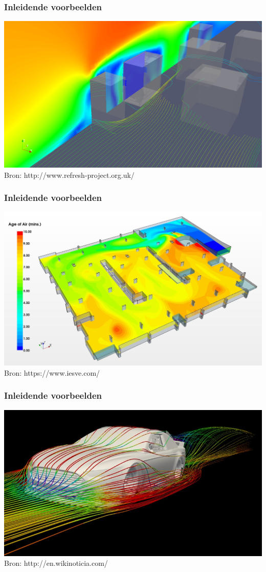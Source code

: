 \documentclass[t]{beamer}
\subtitle{Inleiding}
\begin{document}
	\frame{\titlepage}
	\begin{frame}
		\frametitle{Inleidende voorbeelden}
		\center
    	\includegraphics[height=0.7\textheight]{fig/inleiding/building_neighbourhood_cfd}\\
		\footnotesize{Bron: http://www.refresh-project.org.uk/}
  	\end{frame}
	\begin{frame}
		\frametitle{Inleidende voorbeelden}
		\center
    	\includegraphics[height=0.7\textheight]{fig/inleiding/ventilation_cfd}\\
		\footnotesize{Bron: https://www.iesve.com/}
  	\end{frame}
	\begin{frame}
		\frametitle{Inleidende voorbeelden}
		\center
    	\includegraphics[height=0.7\textheight]{fig/inleiding/Ford-Fusion-CFD}\\
		\footnotesize{Bron: http://en.wikinoticia.com/}
  	\end{frame}
\end{document}

